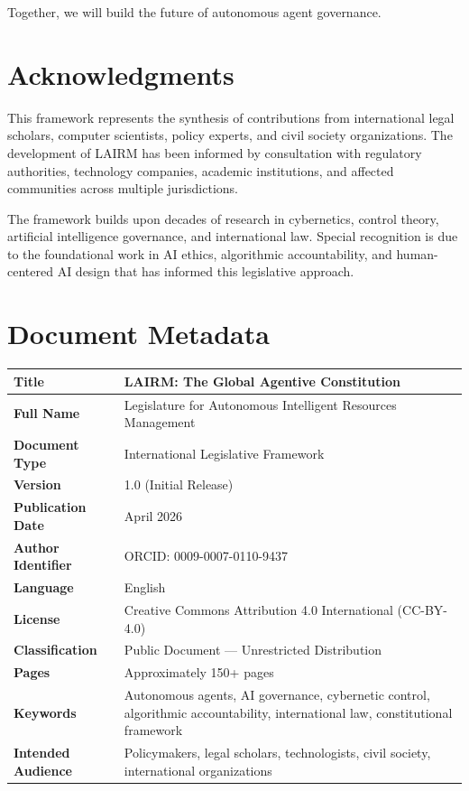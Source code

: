 \documentclass[12pt,a4paper,twoside,openright]{book}
\begin{document}
Together, we will build the future of autonomous agent governance.

\cleardoublepage

\chapter*{Acknowledgments}

This framework represents the synthesis of contributions from international legal scholars, computer scientists, policy experts, and civil society organizations. The development of LAIRM has been informed by consultation with regulatory authorities, technology companies, academic institutions, and affected communities across multiple jurisdictions.

The framework builds upon decades of research in cybernetics, control theory, artificial intelligence governance, and international law. Special recognition is due to the foundational work in AI ethics, algorithmic accountability, and human-centered AI design that has informed this legislative approach.

\cleardoublepage

\chapter*{Document Metadata}

\begin{tabularx}{\textwidth}{@{}lX@{}}
\toprule
\textbf{Title} & LAIRM: The Global Agentive Constitution \\
\midrule
\textbf{Full Name} & Legislature for Autonomous Intelligent Resources Management \\
\midrule
\textbf{Document Type} & International Legislative Framework \\
\midrule
\textbf{Version} & 1.0 (Initial Release) \\
\midrule
\textbf{Publication Date} & April 2026 \\
\midrule
\textbf{Author Identifier} & ORCID: 0009-0007-0110-9437 \\
\midrule
\textbf{Language} & English \\
\midrule
\textbf{License} & Creative Commons Attribution 4.0 International (CC-BY-4.0) \\
\midrule
\textbf{Classification} & Public Document — Unrestricted Distribution \\
\midrule
\textbf{Pages} & Approximately 150+ pages \\
\midrule
\textbf{Keywords} & Autonomous agents, AI governance, cybernetic control, algorithmic accountability, international law, constitutional framework \\
\midrule
\textbf{Intended Audience} & Policymakers, legal scholars, technologists, civil society, international organizations \\
\bottomrule
\end{tabularx}
\end{document}
